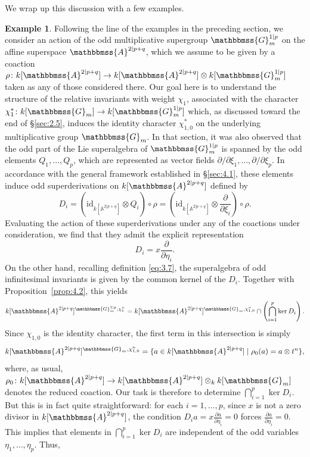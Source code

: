 \documentclass[11pt,a4paper,reqno,noamsfonts]{amsart}
\numberwithin{equation}{section}
\theoremstyle{definition}
\newtheorem{example}[theorem]{Example}
\theoremstyle{remark}
\renewcommand{\AA}{\ensuremath{\mathbbmss{A}}}
\newcommand{\GG}{\ensuremath{\mathbbmss{G}}}
\begin{document}
We wrap up this discussion with a few examples.

\begin{example}
Following the line of the examples in the preceding section, we consider an action of the odd multiplicative supergroup $\GG_m^{1 \vert p}$ on the affine superspace $\AA^{2 \vert p+q}$, which we assume to be given by a coaction $\rho \colon k[\AA^{2 \vert p+q}] \to k[\AA^{2 \vert p+q}] \otimes k[\GG_m^{1 \vert p}]$ taken as any of those considered there. Our goal here is to understand the structure of the relative invariants with weight $\chi_1$, associated with the character $\chi_1^* \colon k[\GG_m] \to k[\GG_m^{1 \vert p}]$ which, as discussed toward the end of \S\ref{sec:2.5}, induces the identity character $\chi_{1,0}^*$ on the underlying multiplicative group $\GG_m$. In that section, it was also observed that the odd part of the Lie superalgebra of $\GG_m^{1 \vert p}$ is spanned by the odd elements $Q_1,\dots,Q_p$, which are represented as vector fields $\partial / \partial \xi_1, \dots,\partial / \partial \xi_p$. In accordance with the general framework established in \S\ref{sec:4.1}, these elements induce odd superderivations on $k[\AA^{2 \vert p+q}]$ defined by
$$
D_i = (\mathrm{id}_{k[\mathbb{A}^{2 \vert p+q}]} \otimes Q_i) \circ \rho = \left( \mathrm{id}_{k[\mathbb{A}^{2 \vert p+q}]} \otimes \frac{\partial}{\partial \xi_i} \right) \circ \rho.
$$
Evaluating the action of these superderivations under any of the coactions under consideration, we find that they admit the explicit representation
$$ 
D_i = x \frac{\partial}{\partial \eta_i}.
$$
On the other hand, recalling definition \eqref{eq:3.7}, the superalgebra of odd infinitesimal invariants is given by the common kernel of the $D_i$. Together with Proposition~\ref{prop:4.2}, this yields
$$
k[\AA^{2 \vert p+q}]^{\GG_m^{1\vert p}, \chi_1^{n}} = k[\AA^{2 \vert p+q}]^{\GG_m,\chi_{1,0}^{n}} \cap \left( \bigcap_{i=1}^{p} \ker D_i\right).
$$
Since $\chi_{1,0}$ is the identity character, the first term in this intersection is simply
$$
k[\AA^{2 \vert p+q}]^{\GG_m,\chi_{1,0}^{n}} = \{ a \in k[\AA^{2 \vert p+q}] \mid \rho_0(a) = a \otimes t^{n} \},
$$
where, as usual, $\rho_0 \colon k[\AA^{2 \vert p+q}] \to k[\AA^{2 \vert p+q}] \otimes_k k[\GG_m]$ denotes the reduced coaction. Our task is therefore to determine $\bigcap_{i=1}^{p} \ker D_i$. But this is in fact quite straightforward: for each $i = 1,\dots,p$, since $x$ is not a zero divisor in $k[\AA^{2 \vert p+q}]$, the condition $D_i a = x \frac{\partial a}{\partial \eta_i} = 0$ forces $\frac{\partial a}{\partial \eta_i} = 0$. This implies that elements in $\bigcap_{i=1}^{p} \ker D_i$ are independent of the odd variables $\eta_1,\dots,\eta_p$. Thus,

\end{example}
\end{document}
